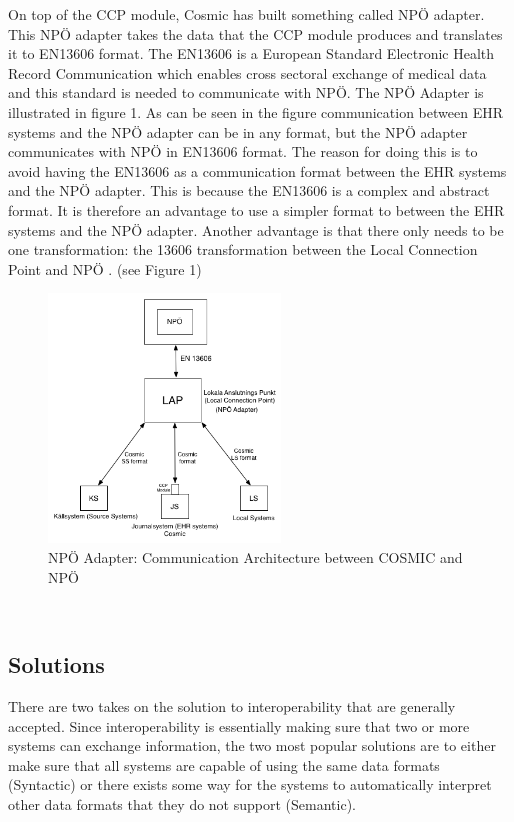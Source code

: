 \documentclass[14pt]{article}
\begin{document}
On top of the CCP module, Cosmic has built something called NPÖ adapter. This NPÖ adapter takes the data that the CCP module produces and translates it to \gls{EN13606} format. The \gls{EN13606} is a European Standard Electronic Health Record Communication which enables cross sectoral exchange of medical data and this standard is needed to communicate with NPÖ. The NPÖ Adapter is illustrated in figure 1. As can be seen in the figure communication between \gls{EHR} systems and the NPÖ adapter can be in any format, but the NPÖ adapter communicates with NPÖ in \gls{EN13606} format. The reason for doing this is to avoid having the \gls{EN13606} as a communication format between the \gls{EHR} systems and the NPÖ adapter. This is because the \gls{EN13606} is a complex and abstract format. It is therefore an advantage to use a simpler format to between the \gls{EHR} systems and the NPÖ adapter. Another advantage is that there only needs to be one transformation: the 13606 transformation between the Local Connection Point and NPÖ  \cite{ViktorJernelov}. (see Figure 1) 

\begin{figure}[h!]
  \caption{NPÖ Adapter: Communication Architecture between COSMIC and NPÖ}
  \centering
    \includegraphics[width=0.55\textwidth]{Images/npoNewAdapt}
\end{figure}\
\label{sec:npoIntervi}

\subsection{Solutions}
\label{sec:interopSolutions}
There are two takes on the solution to interoperability that are generally accepted.  Since interoperability is essentially making sure that two or more systems can exchange information, the two most popular solutions are to either make sure that all systems are capable of using the same data formats (Syntactic) or there exists some way for the systems to automatically interpret other data formats that they do not support (Semantic).
\end{document}
